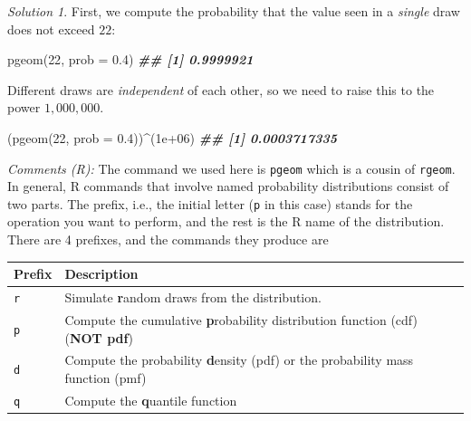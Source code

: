 \documentclass[
]{book}
\newenvironment{Shaded}{\begin{snugshade}}{\end{snugshade}}
\newcommand{\AttributeTok}[1]{\textcolor[rgb]{0.77,0.63,0.00}{#1}}
\newcommand{\DecValTok}[1]{\textcolor[rgb]{0.00,0.00,0.81}{#1}}
\newcommand{\DocumentationTok}[1]{\textcolor[rgb]{0.56,0.35,0.01}{\textbf{\textit{#1}}}}
\newcommand{\FloatTok}[1]{\textcolor[rgb]{0.00,0.00,0.81}{#1}}
\newcommand{\FunctionTok}[1]{\textcolor[rgb]{0.00,0.00,0.00}{#1}}
\newcommand{\NormalTok}[1]{#1}
\newcommand{\SpecialCharTok}[1]{\textcolor[rgb]{0.00,0.00,0.00}{#1}}
\theoremstyle{definition}
\theoremstyle{definition}
\theoremstyle{definition}
\theoremstyle{definition}
\theoremstyle{remark}
\newtheorem*{solution}{Solution}
\begin{document}
\begin{solution}
First, we compute the probability that the value seen in a \emph{single} draw does not exceed \(22\):

\begin{Shaded}
\begin{Highlighting}[]
\FunctionTok{pgeom}\NormalTok{(}\DecValTok{22}\NormalTok{, }\AttributeTok{prob =} \FloatTok{0.4}\NormalTok{)}
\DocumentationTok{\#\# [1] 0.9999921}
\end{Highlighting}
\end{Shaded}

Different draws are \emph{independent} of each other, so we need to raise this to the power \(1,000,000\).

\begin{Shaded}
\begin{Highlighting}[]
\NormalTok{(}\FunctionTok{pgeom}\NormalTok{(}\DecValTok{22}\NormalTok{, }\AttributeTok{prob =} \FloatTok{0.4}\NormalTok{))}\SpecialCharTok{\^{}}\NormalTok{(}\FloatTok{1e+06}\NormalTok{)}
\DocumentationTok{\#\# [1] 0.0003717335}
\end{Highlighting}
\end{Shaded}

\emph{Comments (R):} The command we used here is \texttt{pgeom} which is a cousin of \texttt{rgeom}. In
general, R commands that involve named probability distributions consist of two
parts. The prefix, i.e., the initial letter (\texttt{p} in this case) stands for the
operation you want to perform, and the rest is the R name of the distribution.
There are 4 prefixes, and the commands they produce are

\begin{longtable}[]{@{}
  >{\raggedright\arraybackslash}p{}
  >{\raggedright\arraybackslash}p{}@{}}
\toprule
Prefix & Description \\
\midrule
\endhead
\texttt{r} & Simulate \textbf{r}andom draws from the distribution. \\
\texttt{p} & Compute the cumulative \textbf{p}robability distribution function (cdf) (\textbf{NOT pdf}) \\
\texttt{d} & Compute the probability \textbf{d}ensity (pdf) or the probability mass function (pmf) \\
\texttt{q} & Compute the \textbf{q}uantile function \\
\bottomrule
\end{longtable}


\end{solution}
\end{document}
